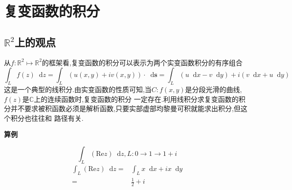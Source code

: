 \documentclass[UTF8]{ctexart}
\newcommand{\dif}{\mathop{}\!\mathrm{d}}
\begin{document}
\section{复变函数的积分}
\subsection{$\mathbb{R}^{2}$上的观点}
从$f : \mathbb{R}^2 \mapsto\mathbb{R}^2$的框架看,复变函数的积分可以表示为两个实变函数积分的有序组合
\begin{equation}
  \int_{L} f(z)\dif z=\int_{L}(u(x,y)+iv(x,y))\cdot\dif\mathbf{s}=\int_{L}(u\dif x-v\dif y)+i(v\dif x+u\dif y)
\end{equation}
这是一个典型的线积分.由实变函数的性质可知,当$C:f(x,y)$是分段光滑的曲线,$f(z)$是$\mathbb{C}$上的连续函数时,复变函数的积分
一定存在.利用线积分求复变函数的积分并不要求被积函数必须是解析函数,只要实部虚部均黎曼可积就能求出积分,但这个积分也往往和
路径有关.

\textbf{算例}

\begin{equation}
  \int_{L}(\text{Re} z)\dif z,L:0\rightarrow 1\rightarrow 1+i
\end{equation}
\begin{align}
  \label{8}
  \int_{L}(\text{Re} z)\dif z=&\int_{L}x\dif x+ix\dif y \\
  =&\frac{1}{2}+i
\end{align}
\end{document}
